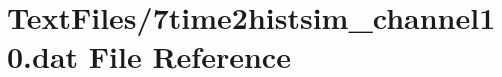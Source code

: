 \hypertarget{7time2histsim__channel10_8dat}{}\section{Text\+Files/7time2histsim\+\_\+channel10.dat File Reference}
\label{7time2histsim__channel10_8dat}
